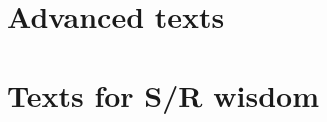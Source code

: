 \documentclass[krantz2]{krantz}\usepackage{knitr}%
\begin{document}
\section{Advanced texts}

\cite{Xie2013,Chambers2016,Wickham2015,Wickham2014advanced,Wickham2016,Pinheiro2000,Murrell2011,Matloff2011,Ihaka1996,Venables2000}

\section{Texts for S/R wisdom}

\cite{Burns1998,Burns2011,Burns2012,Bentley1986,Bentley1988}

\backmatter

\printbibliography

\printindex

\printindex[rcatsidx]

\printindex[rindex]
\end{document}
